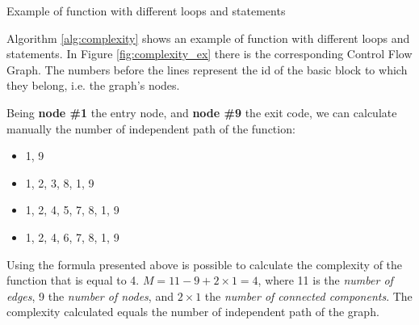 \begin{algorithm}
	\caption{Example of function with different loops and statements}\label{alg:complexity}
	\begin{algorithmic}[1]
		
		\setcounter{ALG@line}{0}
		\setcounter{ALG@line}{1}
		\setcounter{ALG@line}{2}
		\Else{ }
		\setcounter{ALG@line}{3}
		\setcounter{ALG@line}{4}
		\Else{}
		\setcounter{ALG@line}{5}
		
		\EndIf
		
		\EndIf
		\setcounter{ALG@line}{7}
		
		
		
		\EndWhile
		
		
		
		\setcounter{ALG@line}{0}
		
		
	\end{algorithmic}
\end{algorithm}

Algorithm \ref{alg:complexity} shows an example of function with different loops and statements. In Figure \ref{fig:complexity_ex} there is the corresponding Control Flow Graph. The numbers before the lines represent the id of the basic block to which they belong, i.e. the graph's nodes.

Being \textbf{node \#1} the entry node, and \textbf{node \#9} the exit code, we can calculate manually the number of independent path of the function:
\begin{itemize}
	\item 1, 9
	\item 1, 2, 3, 8, 1, 9
	\item 1, 2, 4, 5, 7, 8, 1, 9
	\item 1, 2, 4, 6, 7, 8, 1, 9
\end{itemize}

	Using the formula presented above is possible to calculate the complexity of the function that is equal to 4. $M = 11 - 9 + 2 \times 1 = 4$, where 11 is the \textit{number of edges}, 9 the \textit{number of nodes}, and $2 \times 1$ the \textit{number of connected components}. The complexity calculated equals the number of independent path of the graph.

